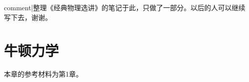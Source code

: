 \def\r{\boldsymbol{r}}
\def\v{\boldsymbol{v}}
\def\a{\boldsymbol{a}}
\def\xx{\boldsymbol{x}}
\def\p{\boldsymbol{p}}
\def\q{\boldsymbol{q}}
\newcommand{\h}{\boldsymbol{h}}
\def\pp{\boldsymbol{P}}
\def\rr{\boldsymbol{R}}
\def\f{\boldsymbol{f}}
\def\F{\boldsymbol{F}}
\def\G{\boldsymbol{G}}
\def\M{\boldsymbol{M}}
\def\J{\boldsymbol{J}}
\def\j{\mathbb{J}}
\def\tr{\operatorname{tr}}
\def\o{\boldsymbol{\omega}}
\def\dis{\displaystyle}
\theoremstyle{plain}\newtheorem{formula}{公式}
\theoremstyle{remark}\newtheorem{ge}{推广}
{{comment|整理《经典物理选讲》的笔记于此，只做了一部分。以后的人可以继续写下去，谢谢。}}
\section{牛顿力学}
本章的参考材料为\cite{Li}第1章。
